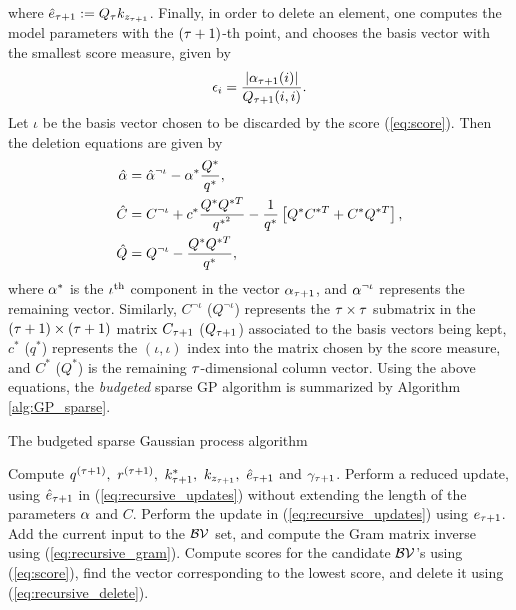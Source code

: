 \documentclass[letterpaper,12pt,peerreviewca,draftcls]{IEEEtran}
\begin{document}
where $\hat{e}_{\tau+1}:= Q_\tau k_{z_{\tau+1}}$. Finally, in order to
delete an element, one computes the model parameters with the $(\tau+1)$-th
point, and chooses the basis vector with the smallest score measure, given by
\begin{equation} \label{eq:score}
 \epsilon_i = \frac{|\alpha_{\tau+1}(i)|}{Q_{\tau+1}(i,i)}.
\end{equation}
Let $\iota$ be the basis vector chosen to be discarded by the score
(\ref{eq:score}). Then the deletion equations are given by
\begin{equation}
 \label{eq:recursive_delete}
 \begin{aligned}
 \hat{\alpha} & = \hat {\alpha}^{\neg \iota} -\alpha^*\frac{Q^{*}}{q^{*}}, \\
 \hat{C}   & = C^{\neg \iota} + c^*\frac{Q^{*}Q^{*T}}{q^{*^{2}}}
                 - \frac{1}{q^{*}}\left[Q^{*}C^{*T} + C^*Q^{*T}\right], \\
 \hat{Q}   & = Q^{\neg \iota}-\frac{Q^*Q^{*T}}{q^*},
 \end{aligned}
\end{equation}
 where $\alpha^{*}$ is the $\iota^{\rm th}$ component in the vector
 $\alpha_{\tau+1}$,  and $\alpha^{\neg \iota}$ represents the remaining vector.
 Similarly, $C^{\neg \iota}$ ($Q^{\neg \iota}$) represents the
 $\tau \times \tau$ submatrix in the $(\tau+1)\times(\tau+1)$ matrix
 $C_{\tau+1}$ ($Q_{\tau+1}$) associated to the basis vectors being kept,
 $c^*$ ($q^*$) represents the $(\iota,\iota)$ index into the
 matrix chosen by the score measure, and $C^{*}$ ($Q^*$) is the remaining
 $\tau$-dimensional column vector. Using the above equations, the
 \emph{\emph{budgeted}} sparse GP algorithm is summarized by
 Algorithm \ref{alg:GP_sparse}. 
 
 \begin{algorithm}[t]
   \caption{The budgeted sparse Gaussian process algorithm \label{alg:GP_sparse}}
{\renewcommand{\baselinestretch}{1}
	   \begin{algorithmic}[1]
    \STATE Compute $q^{(\tau+1)},\  r^{(\tau+1)},\  k_{\tau+1}^*,\
      k_{z_{\tau+1}},\ \hat{e}_{\tau+1}$ and $\gamma_{\tau+1}$.
    \IF{$\gamma_{\Tdisc+1} < \e_{tol}$}
      \STATE Perform a reduced update, using $\hat{e}_{\tau+1}$ in
 	   (\ref{eq:recursive_updates}) without extending the length of the
 	   parameters $\alpha$ and $C$.
    \ELSE
 	 \STATE Perform the update in (\ref{eq:recursive_updates}) using
 	   $e_{\tau+1}$. Add the current input to the $\mathcal{BV}$ set, and compute the
 	   Gram matrix inverse using (\ref{eq:recursive_gram}).
      \STATE Compute scores for the candidate $\mathcal{BV}$'s using (\ref{eq:score}),
 	   find the vector corresponding to the lowest score, and delete it using
 	   (\ref{eq:recursive_delete}).
     \ENDIF
    \ENDIF
    \ENDWHILE
     \end{algorithmic}}
 \end{algorithm}
 
\end{document}
